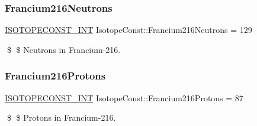 \subsubsection{\texorpdfstring{Francium216\+Neutrons}{Francium216Neutrons}}
{\footnotesize\ttfamily \mbox{\hyperlink{group___isotope_const-_macros_ga5f18360b3e99483a35c32d789e62621c}{I\+S\+O\+T\+O\+P\+E\+C\+O\+N\+S\+T\+\_\+\+I\+NT}} Isotope\+Const\+::\+Francium216\+Neutrons = 129}

\$ \$ Neutrons in Francium-\/216. \mbox{\label{group___isotope_const-_francium-_fr216_ga6f641b20e2a7e7fa180113ba87470a21}} 
\subsubsection{\texorpdfstring{Francium216\+Protons}{Francium216Protons}}
{\footnotesize\ttfamily \mbox{\hyperlink{group___isotope_const-_macros_ga5f18360b3e99483a35c32d789e62621c}{I\+S\+O\+T\+O\+P\+E\+C\+O\+N\+S\+T\+\_\+\+I\+NT}} Isotope\+Const\+::\+Francium216\+Protons = 87}

\$ \$ Protons in Francium-\/216. 